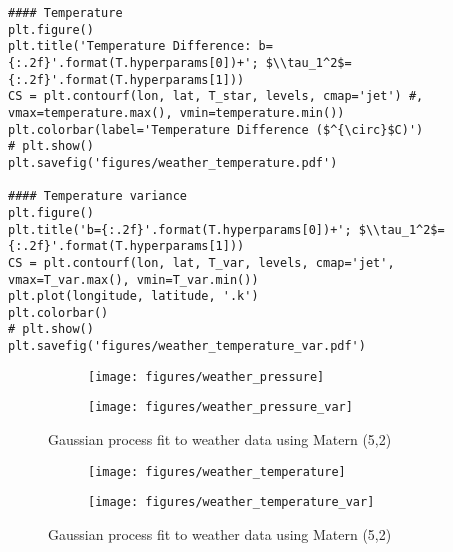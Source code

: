 \documentclass[10pt]{article}
\begin{document}
\begin{enumerate}[label=(\Alph*)]
        \begin{lstlisting}
#### Temperature
plt.figure()
plt.title('Temperature Difference: b={:.2f}'.format(T.hyperparams[0])+'; $\\tau_1^2$={:.2f}'.format(T.hyperparams[1]))
CS = plt.contourf(lon, lat, T_star, levels, cmap='jet') #, vmax=temperature.max(), vmin=temperature.min())
plt.colorbar(label='Temperature Difference ($^{\circ}$C)')
# plt.show()
plt.savefig('figures/weather_temperature.pdf')

#### Temperature variance
plt.figure()
plt.title('b={:.2f}'.format(T.hyperparams[0])+'; $\\tau_1^2$={:.2f}'.format(T.hyperparams[1]))
CS = plt.contourf(lon, lat, T_var, levels, cmap='jet', vmax=T_var.max(), vmin=T_var.min())
plt.plot(longitude, latitude, '.k')
plt.colorbar()
# plt.show()
plt.savefig('figures/weather_temperature_var.pdf')
        \end{lstlisting}

            \begin{figure}
                \begin{subfigure}{.5\textwidth}
                  \centering
                  \texttt{[image: figures/weather\_pressure]}
                \end{subfigure}%
                \begin{subfigure}{.5\textwidth}
                  \centering
                  \texttt{[image: figures/weather\_pressure\_var]}
                \end{subfigure}
            \caption{Gaussian process fit to weather data using Matern (5,2)}
            \label{fig:weather_pressure}
            \end{figure}

            \begin{figure}
                \begin{subfigure}{.5\textwidth}
                  \centering
                  \texttt{[image: figures/weather\_temperature]}
                \end{subfigure}%
                \begin{subfigure}{.5\textwidth}
                  \centering
                  \texttt{[image: figures/weather\_temperature\_var]}
                \end{subfigure}
            \caption{Gaussian process fit to weather data using Matern (5,2)}
            \label{fig:weather_temperature}
            \end{figure}
        

        \end{enumerate}
\end{document}
